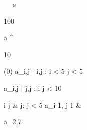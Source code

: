 \begin{eqcode}{\mu}{\ }{\ }{}
  s \gets \begin {tmatrix}
  100  \lend
  \end{tmatrix} \lend
  a \gets \genar \limits ^{\begin{tmatrix} 10  \lend \end{tmatrix}} (0) \lend
  a_{i,j} | i,j : i < 5 \cap j < 5  \lend

  a_{i,j} | j,j : i  \cap j < 10 \gets %
  \begin{cases}
    i \cdot j & j: j < 5 \lend
    a_{i-1, j-1} & \otherwise \lend
  \end{cases} \lend

  a_{2,7}  \lend
   \lend
\end{eqcode}
